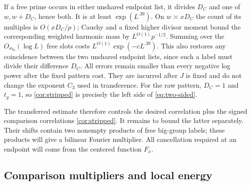 If a free prime occurs in either unshared endpoint list, it divides
$D_C$ and one of $w,w+D_C$, hence both.  It is at least
$\exp(L^{.39})$.  On $w\asymp xD_C$ the count of its multiples is
$O(xD_C/p)$; Cauchy and a fixed higher divisor moment bound the
corresponding weighted harmonic mass by $L^{O(1)}p^{-1/2}$.
Summing over the $O_{m_0}(\log L)$ free slots costs
$L^{O(1)}\exp(-cL^{.39})$.  This also restores any coincidence between
the two unshared endpoint lists, since such a label must divide their
difference $D_C$.  All errors remain smaller than every negative log
power after the fixed pattern cost.  They are incurred after $J$ is
fixed and do not change the exponent $C_3$ used in transference.
For the raw pattern, $D_C=1$ and $t_g=1$, so
\eqref{cor:stripped} is precisely the left side of
\eqref{eq:two-sided}.

The transferred estimate therefore controls the desired correlation
plus the signed comparison correlations \eqref{cor:stripped}.  It
remains to bound the latter separately.  Their shifts contain two
nonempty products of free big-group labels; these products will give
a bilinear Fourier multiplier.  All cancellation required at an
endpoint will come from the centered function $F_x$.

\subsection{Comparison multipliers and local energy}

